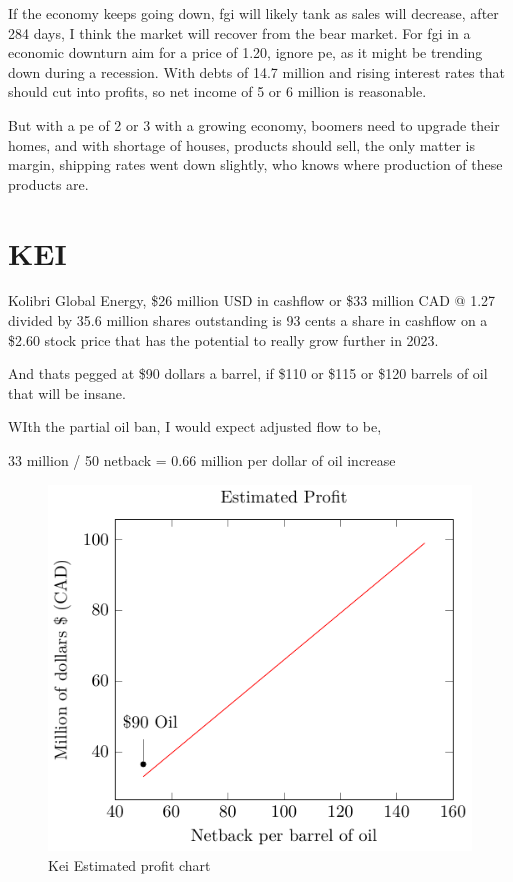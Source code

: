 If the economy keeps going down, fgi will likely tank as sales will decrease, after 284 days, I think the market will recover from the bear market. For fgi in a economic downturn aim for a price of 1.20, ignore pe, as it might be trending down during a recession. With debts of 14.7 million and rising interest rates that should cut into profits, so net income of 5 or 6 million is reasonable.

But with a pe of 2 or 3 with a growing economy, boomers need to upgrade their homes, and with shortage of houses, products should sell, the only matter is margin, shipping rates went down slightly, who knows where production of these products are.

\section{KEI}

Kolibri Global Energy, \$26 million USD in cashflow or \$33 million CAD @ 1.27 divided by 35.6 million shares outstanding is 93 cents a share in cashflow on a \$2.60 stock price that has the potential to really grow further in 2023. 

And thats pegged at \$90 dollars a barrel, if \$110 or \$115 or \$120 barrels of oil that will be insane.


WIth the partial oil ban, I would expect adjusted flow to be, 


33 million / 50 netback = 0.66 million per dollar of oil increase
\begin{figure}
\includegraphics[width=\linewidth]{src/content/images/stonk_research.pdf}
\caption{Kei Estimated profit chart}
\end{figure}

